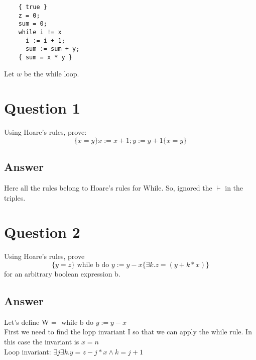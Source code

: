\documentclass[12pt]{article}
\begin{document}
  \begin{lstlisting}
    { true }
    z = 0;
    sum = 0;
    while i != x
      i := i + 1;
      sum := sum + y;
    { sum = x * y }
  \end{lstlisting}

  Let $w$ be the while loop.

  \section{Question 1}
  Using Hoare's rules, prove:
  $$\{x = y\} x:= x+1; y:=y+1 \{x = y\}$$
  \subsection{Answer}
  Here all the rules belong to Hoare's rules for While. So, ignored the $\vdash$ in the triples.
  \begin{prooftree}
  \end{prooftree}

  \section{Question 2}
  Using Hoare’s rules, prove
  $$ \{ y = z \}  \textrm{ while b do } y := y - x \{ \exists k. z = (y + k * x)\} $$
  for an arbitrary boolean expression b.
  \subsection{Answer}
  Let's define W = $\textrm{ while b do } y := y - x $ \\
  First we need to find the lopp invariant I so that we can apply the while rule. In this case the invariant is $x = n$ \\
  Loop invariant: $\exists j\exists k. y = z - j*x \wedge k = j + 1$ \\
\end{document}
